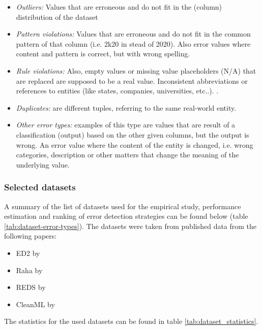 \begin{itemize}
    \item \textit{Outliers:} Values that are erroneous and do not fit in the (column) distribution of the dataset
    \item \textit{Pattern violations:} Values that are erroneous and do not fit in the common pattern of that column (i.e. 2k20 in stead of 2020). Also error values where content and pattern is correct, but with wrong spelling.
    \item \textit{Rule violations:} Also, empty values or missing value placeholders (N/A) that are replaced are supposed to be a real value. Inconsistent abbreviations or references to entities (like states, companies, universities, etc..).
    .\item \textit{Duplicates:} are different tuples, referring to the same real-world entity.
    \item \textit{Other error types:} examples of this type are values that are result of a classification (output) based on the other given columns, but the output is wrong. An error value where the content of the entity is changed, i.e. wrong categories, description or other matters that change the meaning of the underlying value.
\end{itemize}

\subsubsection{Selected datasets}
A summary of the list of datasets used for the empirical study, performance estimation and ranking of error detection strategies can be found below (table \ref{tab:dataset-error-types}). The datasets were taken from published data from the following papers: 
\begin{itemize}
    \item ED2 by \cite{Neutatz2019-aw}
    \item Raha by \cite{Mahdavi2019-zf}
    \item REDS by \cite{Mahdavi2019-pk}
    \item CleanML by \cite{Li2019-ve}
\end{itemize}
The statistics for the used datasets can be found in table \ref{tab:dataset_statistics}.

